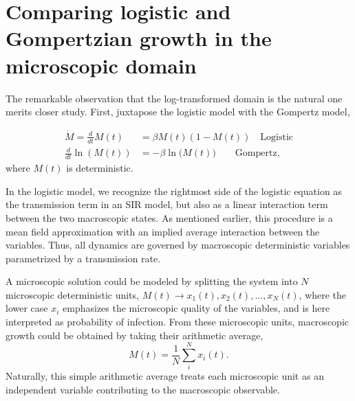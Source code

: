 \documentclass{article}
\begin{document}
\section*{Comparing logistic and Gompertzian growth in the microscopic domain}
The remarkable observation that the log-transformed domain is the natural one merits closer study. First, juxtapose the logistic model with the Gompertz model,

\begin{subequations}
\begin{align}
\dot{M} = \frac{d}{dt}M(t) & = \beta M(t) (1-M(t)) \quad \text{Logistic}\label{eq:compareLog}\\ 
\frac{d}{dt}\ln{(M(t))} & = -\beta \ln{(M(t)}) \quad\quad\text{Gompertz}\label{eq:compareGom},
\end{align}
\end{subequations}
where $M(t)$ is deterministic. 

In the logistic model, we recognize the rightmost side of the logistic equation as the transmission term in an SIR model, but also as a linear interaction term between the two macroscopic states. 
As mentioned earlier, this procedure is a mean field approximation with an implied average interaction between the variables. 
Thus, all dynamics are governed by macroscopic deterministic variables parametrized by a transmission rate.

A microscopic solution could be modeled by splitting the system into $N$ microscopic deterministic units, $M(t) \rightarrow x_1(t), x_2(t), ..., x_N(t)$, where the lower case $x_i$ emphasizes the microscopic quality of the variables, and is here interpreted as probability of infection. From these microscopic units, macroscopic growth could be obtained by taking their arithmetic average,
\begin{equation}
M(t) = \frac{1}{N}\sum_i^N x_i(t).
\end{equation}
Naturally, this simple arithmetic average treats each microscopic unit as an independent variable contributing to the macroscopic observable.
\end{document}
